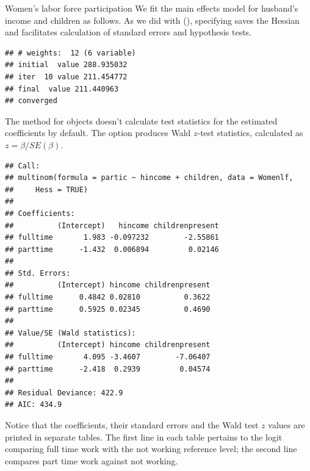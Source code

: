 \documentclass[11pt]{book}
\renewenvironment{knitrout}{\small\renewcommand{\baselinestretch}{.85}}{} %
\begin{document}
\begin{Example}[wlfpart2]{Women's labor force participation}
We fit the main effects model for husband's income and children as follows.
As we did with  (),
specifying  saves the Hessian and facilitates calculation of
standard errors and hypothesis tests.
\begin{knitrout}
\color{fgcolor}\begin{kframe}
\begin{alltt}
 \hlkwb{<-}  \hlopt{~}  \hlopt{+} 
                          \hlstd{=}\hlstd{)}
\end{alltt}
\begin{verbatim}
## # weights:  12 (6 variable)
## initial  value 288.935032 
## iter  10 value 211.454772
## final  value 211.440963 
## converged
\end{verbatim}
\end{kframe}
\end{knitrout}
The  method for  objects doesn't calculate test statistics
for the estimated coefficients by default.  The option  produces
Wald $z$-test statistics, calculated as $z = \beta / SE (\beta)$.
\begin{knitrout}
\color{fgcolor}\begin{kframe}
\begin{alltt}
 \hlstd{=}\hlstd{)}
\end{alltt}
\begin{verbatim}
## Call:
## multinom(formula = partic ~ hincome + children, data = Womenlf, 
##     Hess = TRUE)
## 
## Coefficients:
##          (Intercept)   hincome childrenpresent
## fulltime       1.983 -0.097232        -2.55861
## parttime      -1.432  0.006894         0.02146
## 
## Std. Errors:
##          (Intercept) hincome childrenpresent
## fulltime      0.4842 0.02810          0.3622
## parttime      0.5925 0.02345          0.4690
## 
## Value/SE (Wald statistics):
##          (Intercept) hincome childrenpresent
## fulltime       4.095 -3.4607        -7.06407
## parttime      -2.418  0.2939         0.04574
## 
## Residual Deviance: 422.9 
## AIC: 434.9
\end{verbatim}
\end{kframe}
\end{knitrout}
\noindent Notice that the coefficients, their standard errors and the Wald test $z$ values are
printed in separate tables.  The first line in each table pertains to the logit
comparing full time work with the not working reference level; the second line
compares part time work against not working.


\end{Example}
\end{document}
